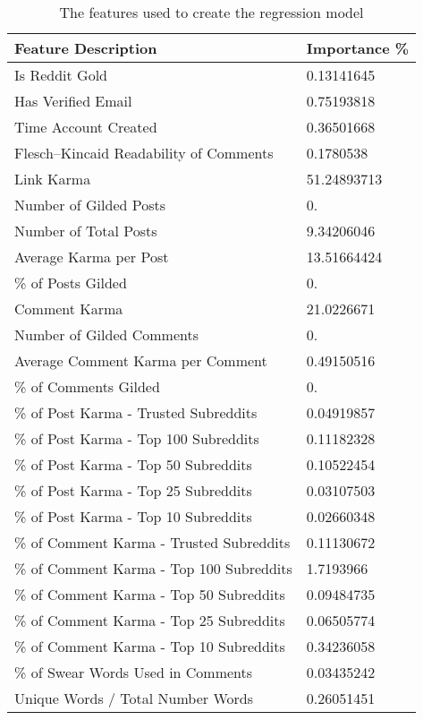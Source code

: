 \begin{table}[tb]
    \caption{The features used to create the regression model}
    \label{tab:tablename}
    \centering
    \scriptsize

    \begin{tabular}{l|l}
    \hline

    \hline
    \textbf{Feature Description} & \textbf{Importance \%} \\
    \hline
Is Reddit Gold                               & 0.13141645  \\
Has Verified Email                           & 0.75193818  \\
Time Account Created                         & 0.36501668  \\
Flesch--Kincaid Readability of Comments      & 0.1780538   \\
Link Karma                                   & 51.24893713 \\
Number of Gilded Posts                       & 0.          \\
Number of Total Posts                        & 9.34206046  \\
Average Karma per Post                       & 13.51664424 \\
\% of Posts Gilded                           & 0.          \\
Comment Karma                                & 21.0226671  \\
Number of Gilded Comments                    & 0.          \\
Average Comment Karma per Comment            & 0.49150516  \\
\% of Comments Gilded                        & 0.          \\
\% of Post Karma - Trusted Subreddits        & 0.04919857  \\
\% of Post Karma - Top 100 Subreddits        & 0.11182328  \\
\% of Post Karma - Top 50 Subreddits         & 0.10522454  \\
\% of Post Karma - Top 25 Subreddits         & 0.03107503  \\
\% of Post Karma - Top 10 Subreddits         & 0.02660348  \\
\% of Comment Karma - Trusted Subreddits     & 0.11130672  \\
\% of Comment Karma - Top 100 Subreddits     & 1.7193966   \\
\% of Comment Karma - Top 50 Subreddits      & 0.09484735  \\
\% of Comment Karma - Top 25 Subreddits      & 0.06505774  \\
\% of Comment Karma - Top 10 Subreddits      & 0.34236058  \\
\% of Swear Words Used in Comments           & 0.03435242  \\
Unique Words / Total Number Words            & 0.26051451  \\
    \hline

    \hline
    \end{tabular}
\end{table}
